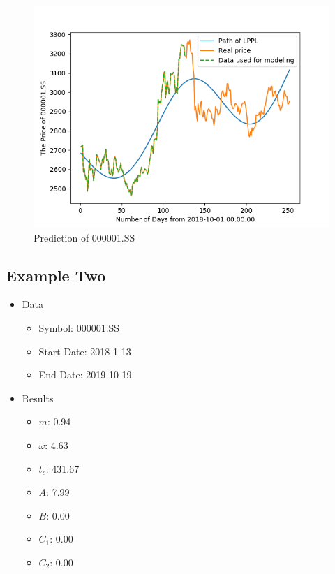 \begin{figure}[H]
    \centering
    \includegraphics[width=\textwidth]{figures/2019-10-22-LPPL.png}
    \caption{Prediction of 000001.SS}
    \label{F:LPPL-prediction}
\end{figure}


\subsection{Example Two}
\begin{minipage}[b]{0.5\textwidth}
\begin{itemize}
    \item Data
        \begin{itemize}
            \item Symbol: 000001.SS
            \item Start Date: 2018-1-13
            \item End Date: 2019-10-19
        \end{itemize}
\end{itemize}
\end{minipage}
\begin{minipage}{0.5\textwidth}
\begin{itemize}
    \item Results
        \begin{itemize}
            \item $m$: 0.94
            \item $\omega$: 4.63
            \item $t_c$: 431.67
            \item $A$: 7.99
            \item $B$: 0.00
            \item $C_1$: 0.00
            \item $C_2$: 0.00
        \end{itemize}
\end{itemize}
\end{minipage}

